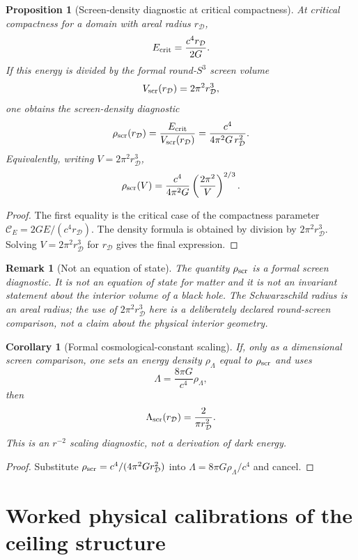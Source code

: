 \documentclass[11pt,a4paper]{article}
\newtheorem{proposition}[theorem]{Proposition}
\newtheorem{corollary}[theorem]{Corollary}
\newtheorem{remark}[theorem]{Remark}
\begin{document}
\begin{proposition}[Screen-density diagnostic at critical compactness]
At critical compactness for a domain with areal radius $r_{\mathcal D}$,
\[
E_{\rm crit}=\frac{c^4r_{\mathcal D}}{2G}.
\]
If this energy is divided by the formal round-$S^3$ screen volume
\[
V_{\rm scr}(r_{\mathcal D})=2\pi^2r_{\mathcal D}^3,
\]
one obtains the screen-density diagnostic
\[
\rho_{\rm scr}(r_{\mathcal D})
=
\frac{E_{\rm crit}}{V_{\rm scr}(r_{\mathcal D})}
=
\frac{c^4}{4\pi^2G\,r_{\mathcal D}^2}.
\]
Equivalently, writing $V=2\pi^2r_{\mathcal D}^3$,
\[
\rho_{\rm scr}(V)
=
\frac{c^4}{4\pi^2G}
\left(\frac{2\pi^2}{V}\right)^{2/3}.
\]
\end{proposition}
\begin{proof}
The first equality is the critical case of the compactness parameter
$\mathcal C_E=2GE/(c^4r_{\mathcal D})$.  The density formula is obtained by division by $2\pi^2r_{\mathcal D}^3$.  Solving $V=2\pi^2r_{\mathcal D}^3$ for $r_{\mathcal D}$ gives the final expression.
\end{proof}

\begin{remark}[Not an equation of state]
The quantity $\rho_{\rm scr}$ is a formal screen diagnostic.  It is not an equation of state for matter and it is not an invariant statement about the interior volume of a black hole.  The Schwarzschild radius is an areal radius; the use of $2\pi^2r_{\mathcal D}^3$ here is a deliberately declared round-screen comparison, not a claim about the physical interior geometry.
\end{remark}

\begin{corollary}[Formal cosmological-constant scaling]
If, only as a dimensional screen comparison, one sets an energy density $\rho_\Lambda$ equal to $\rho_{\rm scr}$ and uses
\[
\Lambda=\frac{8\pi G}{c^4}\rho_\Lambda,
\]
then
\[
\Lambda_{\rm scr}(r_{\mathcal D})
=
\frac{2}{\pi r_{\mathcal D}^2}.
\]
This is an $r^{-2}$ scaling diagnostic, not a derivation of dark energy.
\end{corollary}
\begin{proof}
Substitute $\rho_{\rm scr}=c^4/(4\pi^2G r_{\mathcal D}^2)$ into $\Lambda=8\pi G\rho_\Lambda/c^4$ and cancel.
\end{proof}



\section{Worked physical calibrations of the ceiling structure}
\label{sec:worked-calibrations}
\end{document}
